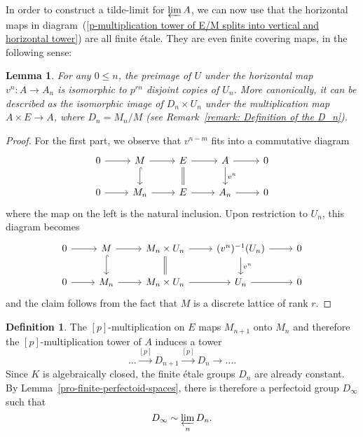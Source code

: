 \documentclass[10pt,oneside]{amsart}
\newtheorem{lemma}[theorem]{Lemma}
\theoremstyle{definition}
\newtheorem{definition}[theorem]{Definition}
\begin{document}
	In order to construct a tilde-limit for $\varprojlim A$, we can now use that the horizontal maps in diagram~(\ref{p-multiplication tower of E/M splits into vertical and horizontal tower}) are all finite \'etale. They are even finite covering maps, in the following sense:
	\begin{lemma}\label{horizontal map is covering map}
		For any $0\leq n$, the preimage of $U$ under the horizontal map $v^{n}:A\rightarrow A_n$ is isomorphic to $p^{rn}$ disjoint copies of $U_n$. More canonically, it can be described as the isomorphic image of $D_{n}\times U_n$ under the multiplication map $A\times E\rightarrow A$, where $D_n=M_n/M$ (see Remark~\ref{remark: Definition of the D_n}).
	\end{lemma}
	\begin{proof}
		For the first part, we observe that $v^{n-m}$ fits into a commutative diagram
			\begin{equation}\label{v-tower for E/M}
			\begin{tikzcd}
			0 \arrow[r] & M \arrow[d, hook] \arrow[r] & E \arrow[d,equal] \arrow[r] &  A\arrow[d, "{v^{n}}"] \arrow[r] & 0 \\
			0 \arrow[r] & M_n \arrow[r] & E \arrow[r] & A_n \arrow[r] & 0
			\end{tikzcd}
			\end{equation}
	where the map on the left is the natural inclusion. Upon restriction to $U_n$, this diagram becomes
					\begin{equation}\label{v-tower for E/M-local}
		\begin{tikzcd}
		0 \arrow[r] & M \arrow[d, hook] \arrow[r] & M_n\times U_n \arrow[d,equal] \arrow[r] &  (v^{n})^{-1}(U_n)\arrow[d, "{v^{n}}"] \arrow[r] & 0 \\
		0 \arrow[r] & M_n \arrow[r] & M_n\times U_n \arrow[r] & U_n \arrow[r] & 0
		\end{tikzcd}
		\end{equation}
	and the claim follows from the fact that $M$ is a discrete lattice of rank $r$.
	\end{proof}
	\begin{definition}
The $[p]$-multiplication on $E$ maps $M_{n+1}$ onto $M_n$ and therefore the $[p]$-multiplication tower of $A$ induces a tower
 \[\dots \xrightarrow{[p]}D_{n+1}\xrightarrow{[p]}D_n\rightarrow\dots.\]
  Since $K$ is algebraically closed, the finite \'etale groups $D_n$ are already constant.  By Lemma~\ref{pro-finite-perfectoid-spaces}, there is therefore a perfectoid group $D_\infty$ such that
  \[D_\infty\sim \varprojlim_n D_n.\]
 \end{definition}
	
\end{document}
